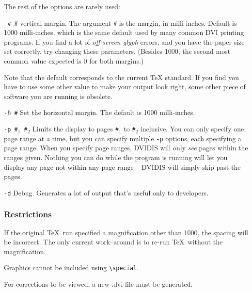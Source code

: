 The rest of the options are rarely used:

\begin{list}%
{}%
{\settowidth{\labelwidth}{\tt-verbose a}
\settowidth{\labelsep}{aaaa}
\settowidth{\rightmargin}{aaa}
\addtolength{\labelwidth}{\labelsep}
\setlength{\leftmargin}{\labelwidth}}
%

\item[{\tt-v \#}] vertical margin.
The argument {\tt\#} is the margin, in milli-inches.
Default is 1000 milli-inches, which is the same default used by many common
DVI printing programs.
If you find a lot of {\sl off-screen glyph}\/ errors, and you have the paper
size set correctly, try changing these parameters.
(Besides 1000, the second most common value expected is 0 for both margins.)

Note that the default corresponds to the current TeX standard.
If you find you have to use some other value to make your output look
right, some other piece of software you are running is obsolete.

\item[\tt-h \#] Set the horizontal margin.
The default is 1000 milli-inches.


\item[\tt-p \#$_1$ \#$_2$] Limits the display to pages {\tt\#$_1$} to
 {\tt\#$_2$} inclusive.
You can only specify one page range at a time, but you can specify multiple
{\tt-p} options, each specifying a page range.
When you specify page ranges, DVIDIS will only {\sl see}\/ pages within the
ranges given.
Nothing you can do while the program is running will let you display any page
not within any page range -- DVIDIS will simply skip past the pages.

\item[\tt-d] Debug.  Generates a lot of output that's useful only to developers.
\end{list}

\subsubsection{Restrictions}

If the original \TeX\ run specified a magnification other than 1000, the
spacing will be incorrect.
The only current work--around is to re-run \TeX\ without the magnification.

Graphics cannot be included using \verb+\special+.

For corrections to be viewed, a new .dvi file must be generated.

